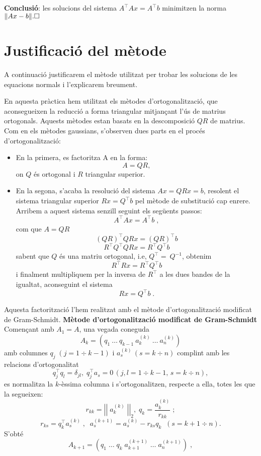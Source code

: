 \documentclass{article}
\begin{document}
\textbf{Conclusió}: les solucions del sistema $  A^\top Ax= A^\top b $ minimitzen la norma $ \| Ax - b \|. \hfill \square$

\section{Justificació del mètode}
A continuació justificarem el mètode utilitzat per trobar les solucions de les equacions normals i l'explicarem breument.

En aquesta pràctica hem utilitzat els mètodes d'ortogonalització, que aconsegueixen la reducció a forma triangular mitjançant l'ús de matrius ortogonals. Aquests mètodes estan basats en la descomposició $QR$ de matrius. Com en els mètodes gaussians, s'observen dues parts en el procés d'ortogonalització:

\begin{itemize}
  \item En la primera, es factoritza A en la forma:
  $$ A =  QR, $$
  on $Q$ és ortogonal i $R$ triangular superior.
  \item En la segona, s'acaba la resolució del sistema $Ax = QRx = b$, resolent el sistema triangular superior $Rx = Q^\top b$ pel mètode de substitució cap enrere. Arribem a aquest sistema senzill seguint els següents passos: 
  $$A^\top Ax = A^\top b \;,$$
  com que $A = QR$
  $$\left(QR \right)^\top QRx = \left(QR \right)^\top b$$
  $$R^\top Q^\top  QRx = R^\top Q^\top  b$$
  sabent que $Q$ és una matriu ortogonal, i.e, $Q^\top =\ Q^{-1}$, obtenim
  $$R^\top Rx = R^\top Q^\top  b$$
  i finalment multipliquem per la inversa de $R^\top$ a les dues bandes de la igualtat, aconseguint el sistema
  $$Rx = Q^\top b \; .$$
\end{itemize}
Aquesta factorització l'hem realitzat amb el mètode d'ortogonalització mo\-di\-fi\-cat de Gram-Schmidt.\newline
\newline
\textbf{Mètode d'ortogonalització modificat de Gram-Schmidt}\newline
\newline
Començant amb $A_{1} = A$, una vegada coneguda
$$A_{k} = \left(q_{1}\: \ldots{}\: q_{k-1}\: a_{k}^{(k)}\: \ldots{} \:a_{n}^{(k)} \right)$$
amb columnes $q_{j}\;\left(j = 1 \div k - 1  \right)$ i $a_{s}^{(k)}\, \left(s = k \div n \right)$ complint amb les relacions d'ortogonalitat
$$q_{j}^\top q_{l} = \delta_{jl},\; q_{j}^\top a_{s} = 0\, \left(j, l = 1 \div k-1,\, s = k \div n \right),$$
es normalitza la $k$-èssima columna i s'ortogonalitzen, respecte a ella, totes les que la segueixen:
$$r_{kk} = \left| \left|\; a_{k}^{(k)}\; \right| \right|_{2}, \; q_{k} = \frac{a_{k}^{(k)}}{r_{kk}}\;; $$ 
$$r_{ks} = q_{k}^\top a_{s}^{(k)}\; , \; \; a_{s}^{(k+1)} = a_{s}^{(k)} - r_{ks}q_{k} \; \; \left( s = k+1 \div n \right) .$$
S'obté
$$A_{k+1} = \left( q_{1} \; \ldots{} \; q_{k} \; a_{k+1}^{(k+1)} \; \ldots{} \; a_{n}^{(k+1)} \right) \; ,$$
\end{document}
